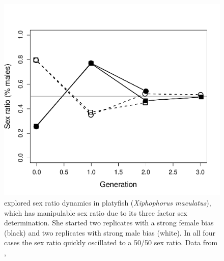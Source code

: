 {\begin{figure}
\begin{center}
\includegraphics[width= 0.75 \textwidth]{Journal_figs/single_locus_selection/Sex_ratio_basolo/Sex_ratio_basolo.pdf}
\end{center}
\caption{\citet{basolo1994dynamics} explored sex ratio dynamics in platyfish ({\it Xiphophorus
 maculatus}), which has manipulable sex ratio due to its three factor sex determination. She started two replicates with a strong female bias (black) and two replicates with strong male bias (white). In all four cases the sex ratio quickly oscillated to a 50/50 sex ratio.  Data from \citet{basolo1994dynamics}, } \label{fig:sex_ratio}
\end{figure}

}
